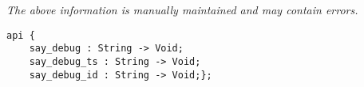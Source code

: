 \label{api:Threadkit\_Debug}

{\tiny \it The above information is manually maintained and may contain errors.}
\begin{verbatim}
api {
    say_debug : String -> Void;
    say_debug_ts : String -> Void;
    say_debug_id : String -> Void;};
\end{verbatim}
